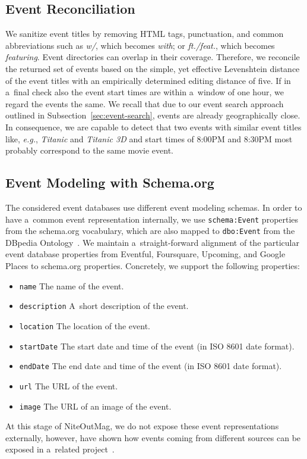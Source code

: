 \documentclass[runningheads,a4paper]{llncs}
\begin{document}
{\subsection{Event Reconciliation}
We sanitize event titles by removing HTML tags, punctuation, and
common abbreviations such as \emph{w/}, which becomes \emph{with}; or \emph{ft./feat.}, which becomes \emph{featuring}.
Event directories can overlap in their coverage.
Therefore, we reconcile the returned set of events based on the simple, yet effective Levenshtein distance of the event titles with an empirically determined editing distance of five.
If in a~final check also the event start times are within a~window of one hour,
we regard the events the same.
We recall that due to our event search approach outlined in Subsection~\ref{sec:event-search},
events are already geographically close.
In consequence, we are capable to detect that two events with similar event titles like, \emph{e.g.}, \emph{Titanic} and \emph{Titanic 3D} and start times of 8:00PM and 8:30PM most probably correspond to the same movie event.

\subsection{Event Modeling with Schema.org}
The considered event databases use different event modeling schemas.
In order to have a~common event representation internally, 
we use \texttt{schema:Event} properties~\cite{schemaorgevent} from the schema.org vocabulary,
which are also mapped to \texttt{dbo:Event} from the DBpedia Ontology~\cite{dbpedia2schemaorg}.
We maintain a~straight-forward alignment of the particular event database properties
from Eventful, Foursquare, Upcoming, and Google Places to schema.org properties.
Concretely, we support the following properties:
\begin{itemize}
  \item \texttt{name} The name of the event.
  \item \texttt{description} A~short description of the event.
  \item \texttt{location} The location of the event.
  \item \texttt{startDate} The start date and time of the event (in ISO 8601 date format).
  \item \texttt{endDate} The end date and time of the event (in ISO 8601 date format).
  \item \texttt{url} The URL of the event.
  \item \texttt{image} The URL of an image of the event.
\end{itemize}
At this stage of NiteOutMag, we do not expose these event representations externally,
however, have shown how events coming from different sources
can be exposed in a~related project~\cite{Liu2011}.

}
\end{document}
